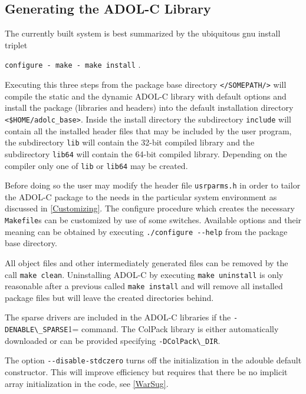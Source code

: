 \documentclass[11pt,twoside]{article}
\begin{document}
\subsection{Generating the ADOL-C Library}
\label{genlib}
%
The currently built system is best summarized by the ubiquitous gnu
install triplet 
\begin{center}
\verb=configure - make - make install= .
\end{center}
Executing this three steps from the package base directory
\verb=</SOMEPATH/=\texttt{\packagetar}\verb=>= will compile the static and the dynamic
ADOL-C library with default options and install the package (libraries
and headers) into the default installation directory {\tt
  \verb=<=\$HOME/adolc\_base\verb=>=}. Inside the install directory
the subdirectory \verb=include= will contain all the installed header
files that may be included by the user program, the subdirectory
\verb=lib= will contain the 32-bit compiled library 
and the subdirectory \verb=lib64= will contain the 64-bit compiled
library. Depending on the compiler only one of \verb=lib= or
\verb=lib64= may be created.

Before doing so the user may modify the header file \verb=usrparms.h=
in order to tailor the \mbox{ADOL-C} package to the needs in the
particular system environment as discussed in 
\autoref{Customizing}. The configure procedure which creates the necessary
\verb=Makefile=s can be customized by use of some switches. Available
options and their meaning can be obtained by executing
\verb=./configure --help= from the package base directory. 

All object files and other intermediately generated files can be
removed by the call \verb=make clean=. Uninstalling ADOL-C by
executing \verb=make uninstall= is only reasonable after a previous
called \verb=make install= and will remove all installed package files
but will leave the created directories behind. 

The sparse drivers are included in the ADOL-C libraries if the
\verb=-DENABLE\_SPARSE=1= command. The ColPack library is either automatically 
downloaded or can be provided specifying \verb=-DColPack\_DIR=.

The option \verb=--disable-stdczero= turns off the initialization in the {\sf adouble} default 
constructor. This will improve efficiency but requires that there be no implicit array initialization in the code, see 
\autoref{WarSug}.  
\end{document}
